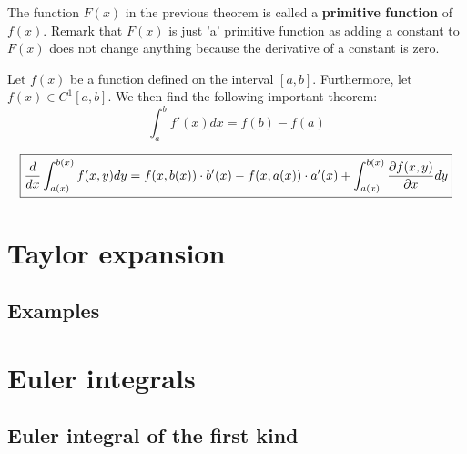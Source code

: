         \begin{remark}
			The function $F(x)$ in the previous theorem is called a \textbf{primitive function} of $f(x)$. Remark that $F(x)$ is just 'a' primitive function as adding a constant to $F(x)$ does not change anything because the derivative of a constant is zero.
		\end{remark}
    
    	\begin{theorem}
			Let $f(x)$ be a function defined on the interval $[a, b]$. Furthermore, let $f(x) \in C^1[a, b]$. We then find the following important theorem:
            \begin{equation}
				\label{calculus:second_fundamental_theorem}
                \boxed{\int_a^bf'(x)dx = f(b) - f(a)}
			\end{equation}
		\end{theorem}
        
        \begin{theorem}
			\begin{equation}
            	\label{calculus:diff_under_integral}
            	\boxed{\frac{d}{dx}\int_{a(x)}^{b(x)}f(x, y)dy = f(x, b(x))\cdot b'(x) - f(x, a(x))\cdot a'(x) + \int_{a(x)}^{b(x)}\frac{\partial f(x, y)}{\partial x}dy}
			\end{equation}
		\end{theorem}
        
	\section{Taylor expansion}
    	\subsection{Examples}
    
    \section{Euler integrals}
    	\subsection{Euler integral of the first kind}
            

